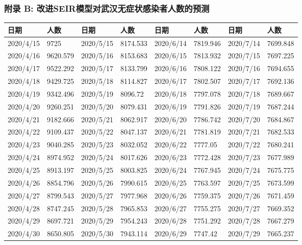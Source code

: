 \documentclass[a4paper, 11pt,twoside=true,UTF8]{scrartcl}
\begin{document}
\subsubsection*{附录 B: 改进SEIR模型对武汉无症状感染者人数的预测}
\begin{table}[H]
	\begin{tabular}{llllllll}
		\hline
		日期        & 人数       & 日期        & 人数       & 日期        & 人数       & 日期        & 人数       \\ \hline
		2020/4/15 & 9725     & 2020/5/15 & 8174.533 & 2020/6/14 & 7819.946 & 2020/7/14 & 7699.848 \\
		2020/4/16 & 9620.579 & 2020/5/16 & 8153.683 & 2020/6/15 & 7813.932 & 2020/7/15 & 7697.225 \\
		2020/4/17 & 9522.292 & 2020/5/17 & 8133.799 & 2020/6/16 & 7808.122 & 2020/7/16 & 7694.655 \\
		2020/4/18 & 9429.725 & 2020/5/18 & 8114.827 & 2020/6/17 & 7802.507 & 2020/7/17 & 7692.136 \\
		2020/4/19 & 9342.496 & 2020/5/19 & 8096.72  & 2020/6/18 & 7797.078 & 2020/7/18 & 7689.667 \\
		2020/4/20 & 9260.251 & 2020/5/20 & 8079.431 & 2020/6/19 & 7791.826 & 2020/7/19 & 7687.244 \\
		2020/4/21 & 9182.666 & 2020/5/21 & 8062.917 & 2020/6/20 & 7786.742 & 2020/7/20 & 7684.867 \\
		2020/4/22 & 9109.437 & 2020/5/22 & 8047.137 & 2020/6/21 & 7781.819 & 2020/7/21 & 7682.533 \\
		2020/4/23 & 9040.285 & 2020/5/23 & 8032.052 & 2020/6/22 & 7777.05  & 2020/7/22 & 7680.241 \\
		2020/4/24 & 8974.952 & 2020/5/24 & 8017.626 & 2020/6/23 & 7772.428 & 2020/7/23 & 7677.989 \\
		2020/4/25 & 8913.197 & 2020/5/25 & 8003.825 & 2020/6/24 & 7767.945 & 2020/7/24 & 7675.775 \\
		2020/4/26 & 8854.796 & 2020/5/26 & 7990.615 & 2020/6/25 & 7763.597 & 2020/7/25 & 7673.599 \\
		2020/4/27 & 8799.543 & 2020/5/27 & 7977.968 & 2020/6/26 & 7759.375 & 2020/7/26 & 7671.459 \\
		2020/4/28 & 8747.245 & 2020/5/28 & 7965.853 & 2020/6/27 & 7755.275 & 2020/7/27 & 7669.352 \\
		2020/4/29 & 8697.721 & 2020/5/29 & 7954.243 & 2020/6/28 & 7751.292 & 2020/7/28 & 7667.279 \\
		2020/4/30 & 8650.805 & 2020/5/30 & 7943.114 & 2020/6/29 & 7747.42  & 2020/7/29 & 7665.237 \\

\end{tabular}
\end{table}
\end{document}
